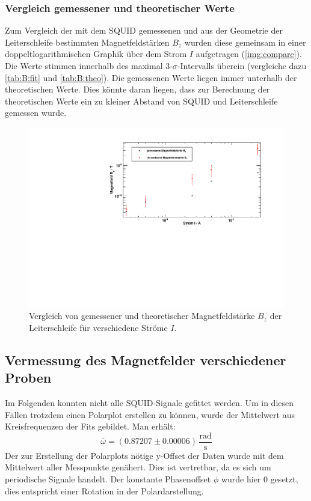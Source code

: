 \subsubsection{Vergleich gemessener und theoretischer Werte}
Zum Vergleich der mit dem SQUID gemessenen und aus der Geometrie der Leiterschleife bestimmten Magnetfeldstärken $B_z$ wurden diese gemeinsam 
in einer doppeltlogarithmischen Graphik über dem Strom $I$ aufgetragen (\autoref{img:compare}). Die Werte stimmen innerhalb des 
maximal 3-$\sigma$-Intervalls überein (vergleiche dazu \autoref{tab:B:fit} und \autoref{tab:B:theo}). Die gemessenen Werte liegen immer unterhalb 
der theoretischen Werte. Dies könnte daran liegen, dass zur Berechnung der theoretischen Werte ein zu kleiner Abstand von SQUID und Leiterschleife 
gemessen wurde.
\begin{figure}[H]
\begin{center}
  \includegraphics[width=\textwidth]{../img/compare_loglog.pdf}
  \caption{Vergleich von gemessener und theoretischer Magnetfeldstärke $B_z$ der Leiterschleife für verschiedene Ströme $I$.}
  \label{img:compare}
\end{center}
\end{figure}

\subsection{Vermessung des Magnetfelder verschiedener Proben}
Im Folgenden konnten nicht alle SQUID-Signale gefittet werden. Um in diesen Fällen trotzdem einen Polarplot erstellen zu können, wurde der 
Mittelwert aus Kreisfrequenzen der Fits gebildet. Man erhält:
\begin{equation}
  \bar{\omega} = (0.87207 \pm 0.00006) \, \frac{\text{rad}}{\text{s}}
\end{equation}
Der zur Erstellung der Polarplots nötige y-Offset der Daten wurde mit dem Mittelwert aller Messpunkte genähert. Dies ist vertretbar, da es sich 
um periodische Signale handelt. Der konstante Phasenoffset $\phi$ wurde hier 0 gesetzt, dies entspricht einer Rotation in der Polardarstellung.

